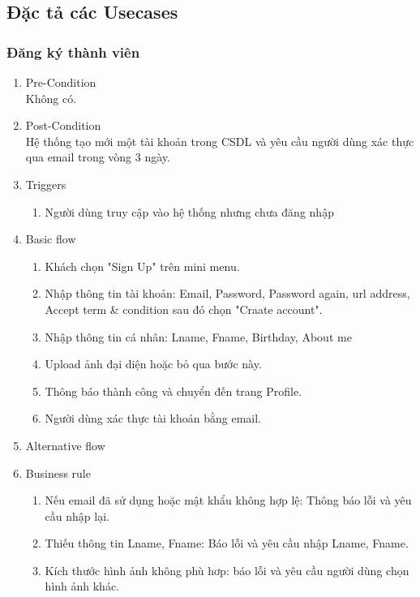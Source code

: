 \subsection{Đặc tả các Usecases}

\subsubsection{Đăng ký thành viên}
\begin{enumerate}
	\item Pre-Condition\\
	Không có.
	\item Post-Condition\\
	Hệ thống tạo mới một tài khoản trong CSDL và yêu cầu người dùng xác thực qua email trong vòng 3 ngày.
	\item Triggers
	\begin{enumerate}
		\item Người dùng truy cập vào hệ thống nhưng chưa đăng nhập
	\end{enumerate}
	\item Basic flow
	\begin{enumerate}
		\item Khách chọn "Sign Up" trên mini menu.
		\item Nhập thông tin tài khoản: Email, Password, Password again, url address, Accept term \& condition sau đó chọn "Craate account".
		\item Nhập thông tin cá nhân: Lname, Fname, Birthday, About me
		\item Upload ảnh đại diện hoặc bỏ qua bước này.
		\item Thông báo thành công và chuyển đến trang Profile.
		\item Người dùng xác thực tài khoản bằng email.
	\end{enumerate}
	\item Alternative flow
	\item Business rule
	\begin{enumerate}
		\item Nếu email đã sử dụng hoặc mật khẩu không hợp lệ: Thông báo lỗi và yêu cầu nhập lại.
		\item Thiếu thông tin Lname, Fname: Báo lỗi và yêu cầu nhập Lname, Fname.
		\item Kích thước hình ảnh không phù hơp: báo lỗi và yêu cầu người dùng chọn hình ảnh khác.
	\end{enumerate}
\end{enumerate}


